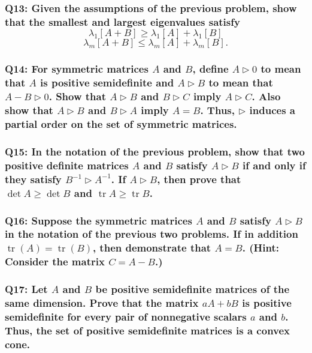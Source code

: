 \documentclass{article}
\begin{document}
\subsubsection*{Q13: Given the assumptions of the previous problem, show that the smallest and largest eigenvalues satisfy
\[
\lambda_1[A + B] \geq \lambda_1[A] + \lambda_1[B]
\]
\[
\lambda_m[A + B] \leq \lambda_m[A] + \lambda_m[B].
\]
}

\subsubsection*{Q14: For symmetric matrices \(A\) and \(B\), define \(A \triangleright 0\) to mean that \(A\) is positive semidefinite and \(A \triangleright B\) to mean that \(A - B \triangleright 0\). Show that \(A \triangleright B\) and \(B \triangleright C\) imply \(A \triangleright C\). Also show that \(A \triangleright B\) and \(B \triangleright A\) imply \(A = B\). Thus, \(\triangleright\) induces a partial order on the set of symmetric matrices.}

\subsubsection*{Q15: In the notation of the previous problem, show that two positive definite matrices \(A\) and \(B\) satisfy \(A \triangleright B\) if and only if they satisfy \(B^{-1} \triangleright A^{-1}\). If \(A \triangleright B\), then prove that \(\det A \geq \det B\) and \(\operatorname{tr} A \geq \operatorname{tr} B\).}

\subsubsection*{Q16: Suppose the symmetric matrices \(A\) and \(B\) satisfy \(A \triangleright B\) in the notation of the previous two problems. If in addition \(\operatorname{tr} (A) = \operatorname{tr} (B)\), then demonstrate that \(A = B\). (Hint: Consider the matrix \(C = A - B\).)}

\subsubsection*{Q17: Let \(A\) and \(B\) be positive semidefinite matrices of the same dimension. Prove that the matrix \(aA + bB\) is positive semidefinite for every pair of nonnegative scalars \(a\) and \(b\). Thus, the set of positive semidefinite matrices is a convex cone.}
\end{document}
